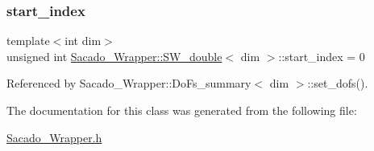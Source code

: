 \mbox{\label{classSacado__Wrapper_1_1SW__double_aa0927ce06528899dd44afe5d770840c1}} 
\subsubsection{\texorpdfstring{start\+\_\+index}{start\_index}}
{\footnotesize\ttfamily template$<$int dim$>$ \\
unsigned int \hyperlink{classSacado__Wrapper_1_1SW__double}{Sacado\+\_\+\+Wrapper\+::\+S\+W\+\_\+double}$<$ dim $>$\+::start\+\_\+index = 0}



Referenced by Sacado\+\_\+\+Wrapper\+::\+Do\+Fs\+\_\+summary$<$ dim $>$\+::set\+\_\+dofs().



The documentation for this class was generated from the following file\+:\begin{DoxyCompactItemize}
\item 
\hyperlink{Sacado__Wrapper_8h}{Sacado\+\_\+\+Wrapper.\+h}\end{DoxyCompactItemize}
